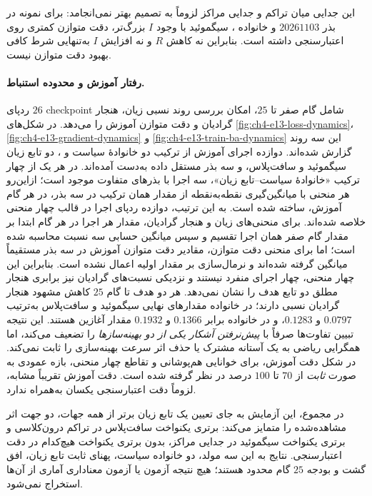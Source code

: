 

این جدایی میان تراکم و جدایی مراکز لزوماً به تصمیم بهتر
نمی‌انجامد: برای نمونه در بذر $20261103$ و خانواده
، سیگموئید با وجود $I$ بزرگ‌تر،
دقت متوازن کمتری روی اعتبارسنجی داشته است.
بنابراین نه کاهش $R$ و نه افزایش $I$
به‌تنهایی شرط کافی بهبود دقت متوازن نیست.

\paragraph{رفتار آموزش و محدوده استنباط.}
ردپای $26$ checkpoint شامل گام صفر تا $25$،
امکان بررسی روند نسبی زیان، هنجار گرادیان و دقت
متوازن آموزش را می‌دهد. در شکل‌های
\ref{fig:ch4-e13-loss-dynamics}،
\ref{fig:ch4-e13-gradient-dynamics} و
\ref{fig:ch4-e13-train-ba-dynamics}
این سه روند گزارش شده‌اند. دوازده اجرای آموزش
از ترکیب دو خانوادهٔ سیاست
 و ، دو تابع زیان
سیگموئید و سافت‌پلاس، و سه بذر مستقل داده
به‌دست آمده‌اند. در هر یک از چهار ترکیب
«خانوادهٔ سیاست--تابع زیان»، سه اجرا با
بذرهای متفاوت موجود است؛ ازاین‌رو هر منحنی
با میانگین‌گیری نقطه‌به‌نقطه از مقدار همان
ترکیب در سه بذر، در هر گام آموزش، ساخته شده است.
به این ترتیب، دوازده ردپای اجرا در قالب چهار
منحنی خلاصه شده‌اند. برای منحنی‌های زیان و
هنجار گرادیان، مقدار هر اجرا در هر گام
ابتدا بر مقدار گام صفر همان اجرا تقسیم و سپس
میانگین حسابی سه نسبت محاسبه شده است؛
اما برای منحنی دقت متوازن، مقادیر دقت
متوازن آموزش در سه بذر مستقیماً
میانگین گرفته شده‌اند و نرمال‌سازی
بر مقدار اولیه اعمال نشده است. بنابراین
این چهار منحنی، چهار اجرای منفرد نیستند
و نزدیکی نسبت‌های گرادیان نیز برابری
هنجار مطلق دو تابع هدف را نشان نمی‌دهد. هر دو هدف تا گام $25$ کاهش
مشهود هنجار گرادیان نسبی دارند؛ در خانواده
 مقدارهای نهایی سیگموئید و
سافت‌پلاس به‌ترتیب $0.0797$ و $0.1283$،
و در خانواده  برابر
$0.1366$ و $0.1932$ مقدار آغازین هستند.
این نتیجه تبیین تفاوت‌ها صرفاً با
\emph{پیش‌نرفتن آشکار یکی از دو بهینه‌سازها}
را تضعیف می‌کند، اما همگرایی ریاضی به یک
آستانه مشترک یا حذف اثر سرعت بهینه‌سازی
را ثابت نمی‌کند. در شکل دقت آموزش،
برای خوانایی هم‌پوشانی و تقاطع چهار منحنی،
بازه عمودی به صورت \emph{ثابت} از $70$
تا $100$ درصد در نظر گرفته شده است.
دقت آموزش تقریباً مشابه، لزوماً دقت اعتبارسنجی
یکسان به‌همراه ندارد.



در مجموع، این آزمایش به جای تعیین یک تابع زیان
برتر از همه جهات، دو جهت اثر مشاهده‌شده را
متمایز می‌کند: برتری یکنواخت سافت‌پلاس
در تراکم درون‌کلاسی و برتری یکنواخت
سیگموئید در جدایی مراکز، بدون برتری
یکنواخت هیچ‌کدام در دقت اعتبارسنجی.
نتایج به این سه مولد، دو خانواده سیاست،
پهنای ثابت تابع زیان، افق گشت و بودجه
$25$ گام محدود هستند؛ هیچ نتیجه آزمون
 یا آزمون معناداری آماری از
آن‌ها استخراج نمی‌شود.

